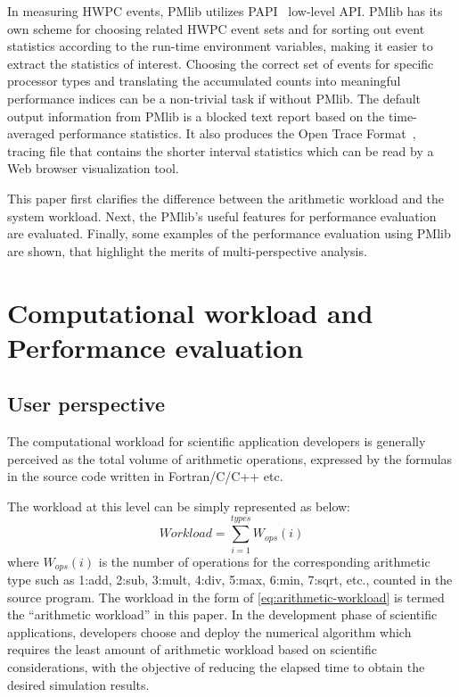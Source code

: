 \documentclass[conference]{IEEEtran}
\begin{document}
In measuring HWPC events, PMlib utilizes PAPI~\cite{PAPI:5.6} low-level API.
PMlib has its own scheme for choosing related HWPC event sets and for sorting
out event statistics according to the run-time environment variables, making it
easier to extract the statistics of interest.
Choosing the correct set of events for specific processor types and
translating the accumulated counts into meaningful performance indices can be
a non-trivial task if without PMlib.
The default output information from PMlib is a blocked text report based on
the time-averaged performance statistics.
It also produces the
Open Trace Format~\cite{Knupfer:2006},~\cite{OTF:webpage-public}
tracing file that contains
the shorter interval statistics which can be read by a Web browser
visualization tool.  %

This paper first clarifies the difference between the arithmetic workload and
the system workload.
Next, the PMlib's useful features for performance evaluation are evaluated.
Finally, some examples of the performance evaluation using PMlib
are shown, that highlight the merits of multi-perspective analysis.

\section{Computational workload and Performance evaluation}
\label{workload-evaluation}

%
\subsection{User perspective}
\label{subsection:user-perspective}

The computational workload for scientific application developers
is generally perceived as the total volume of arithmetic operations,
expressed by the formulas in the source code written in Fortran/C/C++ etc.

The workload at this level can be simply represented as below:
\begin{equation}\label{eq:arithmetic-workload}
	Workload = \sum_{i=1}^{types} W_{ops}(i)
\end{equation}
where $ W_{ops}(i) $ is the number of operations for the
corresponding arithmetic type such as
1:add, 2:sub, 3:mult, 4:div, 5:max, 6:min, 7:sqrt, etc.,
counted in the source program.
The workload in the form of \eqref{eq:arithmetic-workload}
is termed the ``arithmetic workload'' in this paper.
In the development phase of scientific applications, developers
choose and deploy the numerical algorithm which requires the least
amount of arithmetic workload based on scientific considerations,
with the objective of reducing the elapsed time to obtain the desired
simulation results.
\end{document}
